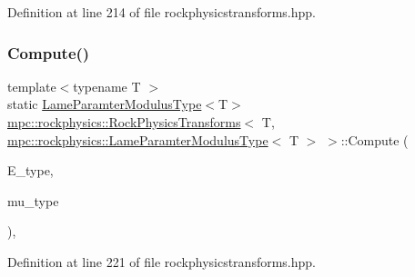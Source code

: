 Definition at line 214 of file rockphysicstransforms.\+hpp.

\mbox{\label{structmpc_1_1rockphysics_1_1_rock_physics_transforms_3_01_t_00_01mpc_1_1rockphysics_1_1_lame_para5e1496021e3962f82419b3f52eb8942_af22a8bb90cf5cf619f3f4510382b164e}} 
\subsubsection{\texorpdfstring{Compute()}{Compute()}\hspace{0.1cm}{\footnotesize\ttfamily [2/7]}}
{\footnotesize\ttfamily template$<$typename T $>$ \\
static \mbox{\hyperlink{structmpc_1_1rockphysics_1_1_lame_paramter_modulus_type}{Lame\+Paramter\+Modulus\+Type}}$<$T$>$ \mbox{\hyperlink{structmpc_1_1rockphysics_1_1_rock_physics_transforms}{mpc\+::rockphysics\+::\+Rock\+Physics\+Transforms}}$<$ T, \mbox{\hyperlink{structmpc_1_1rockphysics_1_1_lame_paramter_modulus_type}{mpc\+::rockphysics\+::\+Lame\+Paramter\+Modulus\+Type}}$<$ T $>$ $>$\+::Compute (\begin{DoxyParamCaption}\item[{const \mbox{\hyperlink{structmpc_1_1rockphysics_1_1_youngs_modulus_type}{mpc\+::rockphysics\+::\+Youngs\+Modulus\+Type}}$<$ T $>$ \&}]{E\+\_\+type,  }\item[{const \mbox{\hyperlink{structmpc_1_1rockphysics_1_1_shear_modulus_type}{mpc\+::rockphysics\+::\+Shear\+Modulus\+Type}}$<$ T $>$ \&}]{mu\+\_\+type }\end{DoxyParamCaption})\hspace{0.3cm}{\ttfamily [inline]}, {\ttfamily [static]}}



Definition at line 221 of file rockphysicstransforms.\+hpp.

